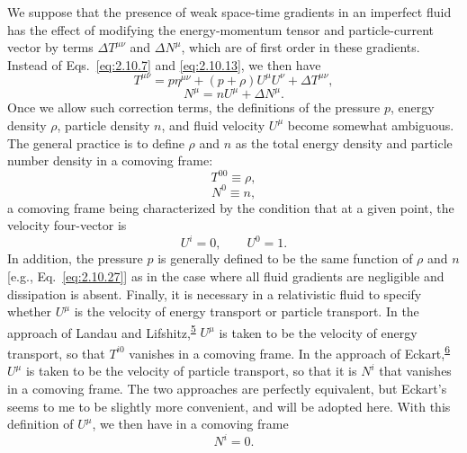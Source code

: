 We suppose that the presence of weak space-time gradients in an imperfect fluid
has the effect of modifying the energy-momentum tensor and particle-current
vector by terms \(\Delta T^{\mu\nu}\) and \(\Delta N^\mu\), which are of first
order in these gradients. Instead of Eqs.~\eqref{eq:2.10.7} and
\eqref{eq:2.10.13}, we then have
\begin{equation}
  T^{\mu\nu}=p\eta^{\mu\nu}
  +(p+\rho)U^\mu U^\nu+\Delta T^{\mu\nu},
  \tag{2.11.1}\label{eq:2.11.1}
\end{equation}
\begin{equation}
  N^\mu=nU^\mu+\Delta N^\mu .
  \tag{2.11.2}\label{eq:2.11.2}
\end{equation}
Once we allow such correction terms, the definitions of the pressure \(p\),
energy density \(\rho\), particle density \(n\), and fluid velocity \(U^\mu\)
become somewhat ambiguous. The general practice is to define \(\rho\) and
\(n\) as the total energy density and particle number density in a comoving
frame:
\begin{equation}
  T^{00}\equiv\rho ,
  \tag{2.11.3}\label{eq:2.11.3}
\end{equation}
\begin{equation}
  N^0\equiv n ,
  \tag{2.11.4}\label{eq:2.11.4}
\end{equation}
a comoving frame being characterized by the condition that at a given point,
the velocity four-vector is
\begin{equation}
  U^i=0,\qquad U^0=1 .
  \tag{2.11.5}\label{eq:2.11.5}
\end{equation}
In addition, the pressure \(p\) is generally defined to be the same function of
\(\rho\) and \(n\) [e.g., Eq.~\eqref{eq:2.10.27}] as in the case where all
fluid gradients are negligible and dissipation is absent. Finally, it is
necessary in a relativistic fluid to specify whether \(U^\mu\) is the velocity
of energy transport or particle transport. In the approach of Landau and
Lifshitz,\textsuperscript{\hyperref[ch2-ref-5]{5}} \(U^\mu\) is taken to be
the velocity of energy transport, so that \(T^{i0}\) vanishes in a comoving
frame. In the approach of Eckart,\textsuperscript{\hyperref[ch2-ref-6]{6}}
\(U^\mu\) is taken to be the velocity of particle transport, so that it is
\(N^i\) that vanishes in a comoving frame. The two approaches are perfectly
equivalent, but Eckart's seems to me to be slightly more convenient, and will be
adopted here. With this definition of \(U^\mu\), we then have in a comoving
frame
\begin{equation}
  N^i=0 .
  \tag{2.11.6}\label{eq:2.11.6}
\end{equation}
